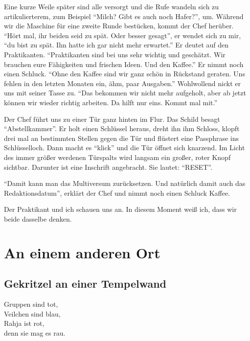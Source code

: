 \documentclass[final]{multiversum}
\begin{document}
Eine kurze Weile später sind alle versorgt und die Rufe wandeln sich zu artikulierterem, zum Beispiel \enquote{Milch? Gibt es auch noch Hafer?}, um.
Während wir die Maschine für eine zweite Runde bestücken, kommt der Chef herüber.
\enquote{Hört mal, ihr beiden seid zu spät. Oder besser gesagt}, er wendet sich zu mir, \enquote{du bist zu spät.
Ihn hatte ich gar nicht mehr erwartet.}
Er deutet auf den Praktikanten.
\enquote{Praktikanten sind bei uns sehr wichtig und geschätzt.
Wir brauchen eure Fähigkeiten und frischen Ideen. 
Und den Kaffee.}
Er nimmt noch einen Schluck.
\enquote{Ohne den Kaffee sind wir ganz schön in Rückstand geraten. 
Uns fehlen in den letzten Monaten ein, ähm, paar Ausgaben.}
Wohlwollend nickt er uns mit seiner Tasse zu.
\enquote{Das bekommen wir nicht mehr aufgeholt, aber ab jetzt können wir wieder richtig arbeiten.
Da hilft nur eins. 
Kommt mal mit.}

Der Chef führt uns zu einer Tür ganz hinten im Flur. 
Das Schild besagt \enquote{Abstellkammer}.
Er holt einen Schlüssel heraus, dreht ihn ihm Schloss, klopft drei mal an bestimmten Stellen gegen die Tür und flüstert eine Passphrase ins Schlüsselloch.
Dann macht es \enquote{klick} und die Tür öffnet sich knarzend.
Im Licht des immer größer werdenen Türspalts wird langsam ein großer, roter Knopf sichtbar.
Darunter ist eine Inschrift angebracht.
Sie lautet: \enquote{RESET}.

\enquote{Damit kann man das Multiversum zurücksetzen.
Und natürlich damit auch das Redaktionsdatum}, erklärt der Chef und nimmt noch einen Schluck Kaffee.

Der Praktikant und ich schauen uns an.
In diesem Moment weiß ich, dass wir beide dasselbe denken.


\section{An einem anderen Ort}

\subsection{Gekritzel an einer Tempelwand}
Gruppen sind tot,\\
Veilchen sind blau,\\
Rahja ist rot,\\
denn sie mag es rau.\\
\end{document}
